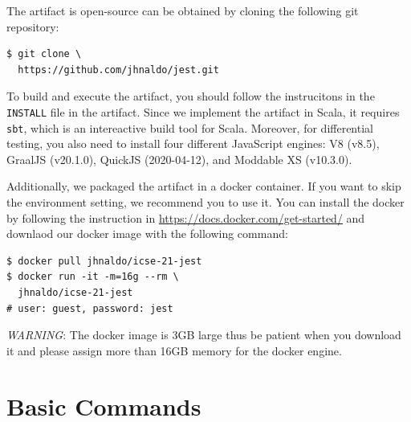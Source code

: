 \documentclass[conference]{IEEEtran}
\begin{document}
The artifact is open-source can be obtained by cloning the following git
repository:
\begin{lstlisting}
$ git clone \
  https://github.com/jhnaldo/jest.git
\end{lstlisting}
To build and execute the artifact, you should follow the instrucitons in the
\texttt{INSTALL} file in the artifact.  Since we implement the artifact in
Scala, it requires \texttt{sbt}, which is an intereactive build tool for Scala.
Moreover, for differential testing, you also need to install four different
JavaScript engines: V8 (v8.5), GraalJS (v20.1.0), QuickJS (2020-04-12), and
Moddable XS (v10.3.0).

Additionally, we packaged the artifact in a docker container.  If you want to
skip the environment setting, we recommend you to use it.  You can install the
docker by following the instruction in
\url{https://docs.docker.com/get-started/} and downlaod our docker image with
the following command:
\begin{lstlisting}
$ docker pull jhnaldo/icse-21-jest
$ docker run -it -m=16g --rm \
  jhnaldo/icse-21-jest
# user: guest, password: jest
\end{lstlisting}
\textit{WARNING}: The docker image is 3GB large thus be patient when you
download it and please assign more than 16GB memory for the docker engine.


\section{Basic Commands}
\end{document}
